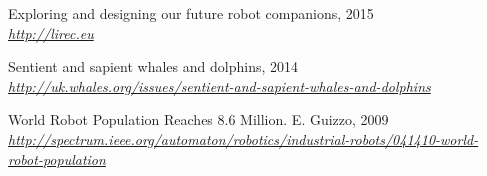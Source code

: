 \documentclass[article]{IEEEtran}
\begin{document}
\begin{thebibliography}{9}
Exploring and designing our future robot companions, 2015
\\\textit{\url{http://lirec.eu}}

Sentient and sapient whales and dolphins, 2014
\\\textit{\url{http://uk.whales.org/issues/sentient-and-sapient-whales-and-dolphins}}

World Robot Population Reaches 8.6 Million. E. Guizzo, 2009
\\\textit{\url{http://spectrum.ieee.org/automaton/robotics/industrial-robots/041410-world-robot-population}}

\end{thebibliography}
\end{document}
